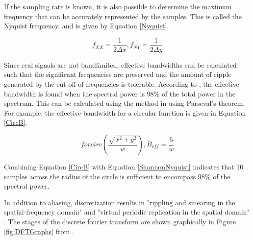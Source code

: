 If the sampling rate is known, it is also possible to determine the maximum frequency that can be accurately represented by the samples.  This is called the Nyquist frequency, and is given by Equation \ref{Nyquist}.  

\begin{equation}
f_{NX} = \frac{1}{2\Delta x}  ,  f_{NY} = \frac{1}{2\Delta y} 
\label{Nyquist}
\end{equation}

Since real signals are not bandlimited, effective bandwidths can be calculated such that the significant frequencies are preserved and the amount of ripple generated by the cut-off of frequencies is tolerable.  According to \cite{CFO}, the effective bandwidth is found when the spectral power is 98\% of the total power in the spectrum.  This can be calculated using the method in \cite{CFO} using Parseval's theorem.  For example, the effective bandwidth for a circular function is given in Equation \ref{CircB}\cite{CFO}. 

\begin{equation}
for circ\left( \frac{\sqrt{x^2 + y^2}}{w}\right) ,  B_{eff} = \frac{5}{w} 
\label{CircB}
\end{equation}

Combining Equation \ref{CircB} with Equation \ref{ShannonNyquist} indicates that 10 samples across the radius of the circle is sufficient to encompass 98\% of the spectral power.  

In addition to aliasing, discretization results in "rippling and smearing in the spatial-frequency domain" and "virtual periodic replication in the spatial domain" \cite{NSOWP}. The stages of the discrete fourier transform are shown graphically in Figure \ref{fig:DFTGraphs} from \cite{NSOWP}.  

